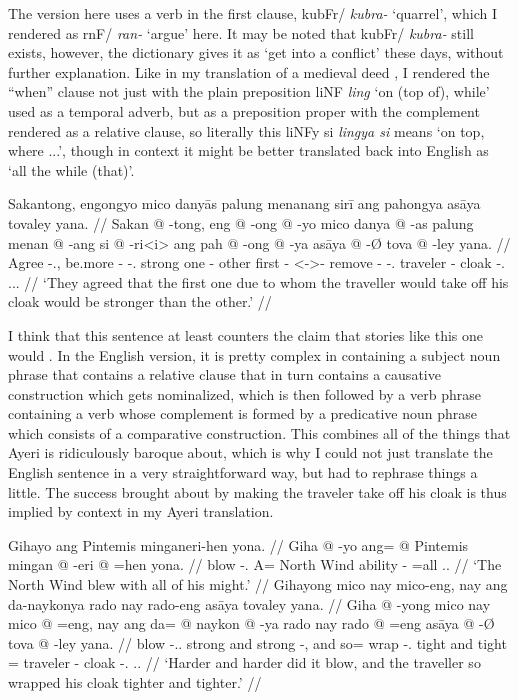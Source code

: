 \documentclass[12pt,paper=a4]{scrartcl}
\newcommand{\ayr}[1]{{\Tagati #1}}
\newcommand{\xayr}[3]{{\Tagati #1} \emph{#2} \enquote*{#3}}
\begin{document}
The \citeyear{becker2004} version here uses a verb in the first clause, \xayr{kubFr/}{kubra-}{quarrel}, which I rendered as \xayr{rnF/}{ran-}{argue} here. It may be noted that \ayr{kubFr/} \textit{kubra-} still exists, however, the dictionary gives it as `get into a conflict' these days, without further explanation. Like in my translation of a medieval deed \autocite[9]{becker2015}, I rendered the \enquote{when} clause not just with the plain preposition \xayr{liNF}{ling}{on (top of), while} used as a temporal adverb, but as a preposition proper with the complement rendered as a relative clause, so literally this \ayr{liNFy si} \textit{lingya si} means `on top, where ...', though in context it might be better translated back into English as `all the while (that)'.

\ex %
\begingl
	\glpreamble Sakantong, engongyo mico danyās palung menanang sirī ang pahongya asāya tovaley yana. //
	\gla Sakan @ -tong, eng @ -ong @ -yo mico danya @ -as palung menan @ -ang si @ -ri<i> ang pah @ -ong @ -ya asāya @ -Ø tova @ -ley yana. //
	\glb Agree -\Tpl{}.\N{}, be.more -\Irr{} -\Tsg{}.\N{} strong one -\Parg{} other first -\Aarg{} \Rel{} <-\Aarg{}>-\Ins{} \AgtT{} remove -\Irr{} -\Tsg{}.\M{} traveler -\Top{} cloak -\Parg{}.\Inan{} \Tsg{}.\M{}.\Gen{}. //
	\glft `They agreed that the first one due to whom the traveller would take off his cloak would be stronger than the other.' //
\endgl
\xe

I think that this sentence at least counters the claim that stories like this one would . In the English version, it is pretty complex in containing a subject noun phrase that contains a relative clause that in turn contains a causative construction which gets nominalized, which is then followed by a verb phrase containing a verb whose complement is formed by a predicative noun phrase which consists of a comparative construction. This combines all of the things that Ayeri is ridiculously baroque about, which is why I could not just translate the English sentence in a very straightforward way, but had to rephrase things a little. The success brought about by making the traveler take off his cloak is thus implied by context in my Ayeri translation.

\pex %
\a \begingl
	\glpreamble Gihayo ang Pintemis minganeri-hen yona. //
	\gla Giha @ -yo ang= @ Pintemis mingan @ -eri @ =hen yona. //
	\glb blow -\Tsg{}.\N{} A= {North Wind} ability -\Ins{} =all \Tsg{}.\N{}. //
	\glft `The North Wind blew with all of his might.' //
\endgl
\a \begingl
	\glpreamble Gihayong mico nay mico-eng, nay ang da-naykonya rado nay rado-eng asāya tovaley yana. //
	\gla Giha @ -yong mico nay mico @ =eng, nay ang da= @ naykon @ -ya rado nay rado @ =eng asāya @ -Ø tova @ -ley yana. //
	\glb blow -\Tsg.\N{}.\Aarg{} strong and strong -\Comp{}, and \AgtT{} so= wrap -\Tsg{}.\M{} tight and tight =\Comp{} traveler -\Top{} cloak -\Parg{}.\Inan{} \Tsg{}.\Gen{}. //
	\glft `Harder and harder did it blow, and the traveller so wrapped his cloak tighter and tighter.' //
\endgl
\end{document}
